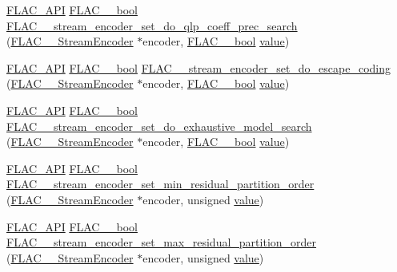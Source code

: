 \begin{DoxyCompactItemize}
\item 
\hyperlink{group__flac__export_ga56ca07df8a23310707732b1c0007d6f5}{F\+L\+A\+C\+\_\+\+A\+PI} \hyperlink{ordinals_8h_a95103469f1cbd78b8cf250194985b34e}{F\+L\+A\+C\+\_\+\+\_\+bool} \hyperlink{group__flac__stream__encoder_ga3aa94a1aec1cf40c37e54434c86bb50d}{F\+L\+A\+C\+\_\+\+\_\+stream\+\_\+encoder\+\_\+set\+\_\+do\+\_\+qlp\+\_\+coeff\+\_\+prec\+\_\+search} (\hyperlink{struct_f_l_a_c_____stream_encoder}{F\+L\+A\+C\+\_\+\+\_\+\+Stream\+Encoder} $\ast$encoder, \hyperlink{ordinals_8h_a95103469f1cbd78b8cf250194985b34e}{F\+L\+A\+C\+\_\+\+\_\+bool} \hyperlink{lib_2expat_8h_a4a30a13b813682e68c5b689b45c65971}{value})
\item 
\hyperlink{group__flac__export_ga56ca07df8a23310707732b1c0007d6f5}{F\+L\+A\+C\+\_\+\+A\+PI} \hyperlink{ordinals_8h_a95103469f1cbd78b8cf250194985b34e}{F\+L\+A\+C\+\_\+\+\_\+bool} \hyperlink{group__flac__stream__encoder_gaa839d19b6d1b30ba0407d419bdb6fe67}{F\+L\+A\+C\+\_\+\+\_\+stream\+\_\+encoder\+\_\+set\+\_\+do\+\_\+escape\+\_\+coding} (\hyperlink{struct_f_l_a_c_____stream_encoder}{F\+L\+A\+C\+\_\+\+\_\+\+Stream\+Encoder} $\ast$encoder, \hyperlink{ordinals_8h_a95103469f1cbd78b8cf250194985b34e}{F\+L\+A\+C\+\_\+\+\_\+bool} \hyperlink{lib_2expat_8h_a4a30a13b813682e68c5b689b45c65971}{value})
\item 
\hyperlink{group__flac__export_ga56ca07df8a23310707732b1c0007d6f5}{F\+L\+A\+C\+\_\+\+A\+PI} \hyperlink{ordinals_8h_a95103469f1cbd78b8cf250194985b34e}{F\+L\+A\+C\+\_\+\+\_\+bool} \hyperlink{group__flac__stream__encoder_ga7fbc05ec9abd249a400fccb9f189e55e}{F\+L\+A\+C\+\_\+\+\_\+stream\+\_\+encoder\+\_\+set\+\_\+do\+\_\+exhaustive\+\_\+model\+\_\+search} (\hyperlink{struct_f_l_a_c_____stream_encoder}{F\+L\+A\+C\+\_\+\+\_\+\+Stream\+Encoder} $\ast$encoder, \hyperlink{ordinals_8h_a95103469f1cbd78b8cf250194985b34e}{F\+L\+A\+C\+\_\+\+\_\+bool} \hyperlink{lib_2expat_8h_a4a30a13b813682e68c5b689b45c65971}{value})
\item 
\hyperlink{group__flac__export_ga56ca07df8a23310707732b1c0007d6f5}{F\+L\+A\+C\+\_\+\+A\+PI} \hyperlink{ordinals_8h_a95103469f1cbd78b8cf250194985b34e}{F\+L\+A\+C\+\_\+\+\_\+bool} \hyperlink{group__flac__stream__encoder_gae3e2dd204f276d051bf1a118383bfda2}{F\+L\+A\+C\+\_\+\+\_\+stream\+\_\+encoder\+\_\+set\+\_\+min\+\_\+residual\+\_\+partition\+\_\+order} (\hyperlink{struct_f_l_a_c_____stream_encoder}{F\+L\+A\+C\+\_\+\+\_\+\+Stream\+Encoder} $\ast$encoder, unsigned \hyperlink{lib_2expat_8h_a4a30a13b813682e68c5b689b45c65971}{value})
\item 
\hyperlink{group__flac__export_ga56ca07df8a23310707732b1c0007d6f5}{F\+L\+A\+C\+\_\+\+A\+PI} \hyperlink{ordinals_8h_a95103469f1cbd78b8cf250194985b34e}{F\+L\+A\+C\+\_\+\+\_\+bool} \hyperlink{group__flac__stream__encoder_ga6de153da5a8eeeb1be2271c27fa58b37}{F\+L\+A\+C\+\_\+\+\_\+stream\+\_\+encoder\+\_\+set\+\_\+max\+\_\+residual\+\_\+partition\+\_\+order} (\hyperlink{struct_f_l_a_c_____stream_encoder}{F\+L\+A\+C\+\_\+\+\_\+\+Stream\+Encoder} $\ast$encoder, unsigned \hyperlink{lib_2expat_8h_a4a30a13b813682e68c5b689b45c65971}{value})

\end{DoxyCompactItemize}
